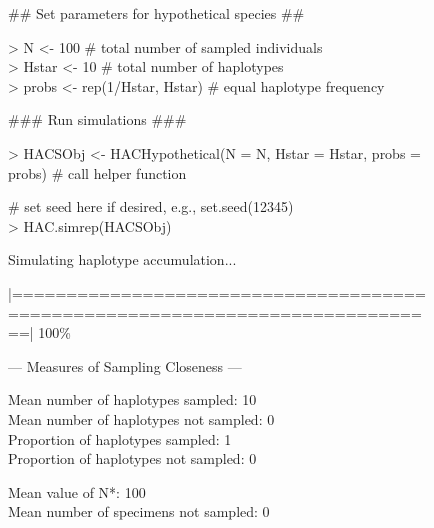 \begin{figure}[H]

{\scriptsize \tt

\vspace{2mm}

{\noindent \#\# Set parameters for hypothetical species \#\#}

\vspace{1mm}

{\noindent > N <- 100 \# total number of sampled individuals} \\
{> Hstar <- 10 \# total number of haplotypes} \\
{> probs <- rep(1/Hstar, Hstar) \# equal haplotype frequency}

\vspace{2mm}

{\noindent \#\#\# Run simulations \#\#\#}

\vspace{1mm}

{\noindent > HACSObj <- HACHypothetical(N = N, Hstar = Hstar, probs = probs) \# call helper function}

\vspace{1mm}

{\noindent \# set seed here if desired, e.g., set.seed(12345)} \\
{> HAC.simrep(HACSObj)} 

\noindent Simulating haplotype accumulation...

\vspace{2mm}
 
\noindent |==============================================================================| 100\%
  
\vspace{3mm}
 
\noindent --- Measures of Sampling Closeness ---

\vspace{2mm} 
 
\noindent Mean number of haplotypes sampled:  10 \\
Mean number of haplotypes not sampled:  0 \\
Proportion of haplotypes sampled:  1 \\
Proportion of haplotypes not sampled:  0

\vspace{2mm} 
 
\noindent Mean value of N*:  100 \\
Mean number of specimens not sampled:  0

}
\end{figure}
